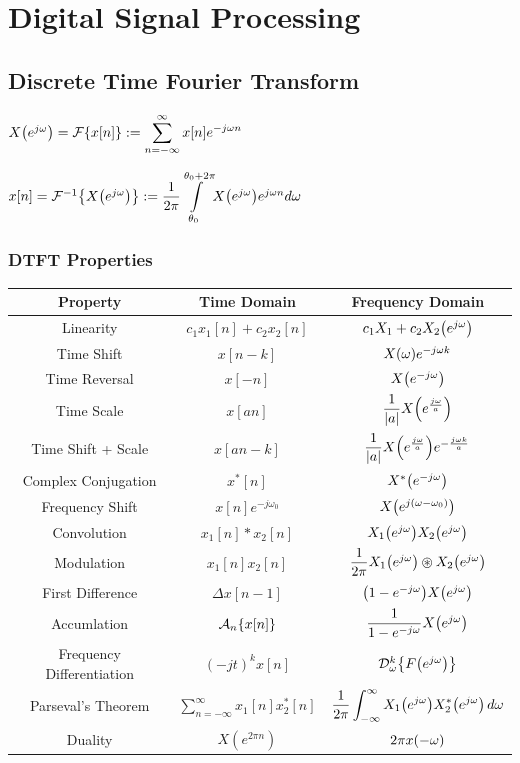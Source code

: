\documentclass[11pt]{article}
\begin{document}
  \section{Digital Signal Processing}

  \subsection{Discrete Time Fourier Transform}
  \begin{multicols}{2}
    \(X{\left( e^{j\omega} \right)} = \mathcal{F}{\left\{ x[n] \right\}} := \displaystyle \sum_{n = -\infty}^{\infty} x[n]e^{-j\omega n}\)

    \columnbreak

    \(x[n] = \mathcal{F}^{-1}{\left\{ X{\left( e^{j\omega} \right)} \right\}} :=
    \dfrac{1}{2\pi}\displaystyle{\int\limits_{\theta_0}^{\theta_0 + 2\pi}} \textstyle
    X{\left( e^{j\omega} \right)}e^{j\omega n} d\omega\)
  \end{multicols}

  \subsubsection{DTFT Properties}

  \bgroup
  \renewcommand{\arraystretch}{2.1}
  \setlength{\tabcolsep}{0.8cm}
  \large\begin{tabular}{c|c|c}
    Property & Time Domain & Frequency Domain \\
    \toprule
    Linearity & \(c_1x_1[n] + c_2x_2[n]\) & \(c_1X_1 + c_2X_2{\left( e^{j\omega} \right)}\) \\
    Time Shift & \(x[n - k]\) & \(X{\left( \omega \right)}e^{-j\omega k}\)\\
    Time Reversal & \(x[-n]\) & \(X{\left( e^{-j\omega} \right)}\)\\
    Time Scale & \(x[an]\) & \(\dfrac{1}{|a|}X{\left( e^{\frac{j\omega}{a}} \right)}\)\\
    Time Shift + Scale & \(x[an - k]\) & \(\dfrac{1}{|a|}X{\left( e^{\frac{j\omega}{a}} \right)}e^{-\frac{j\omega k}{a}}\)\\
    Complex Conjugation & \(x^*[n]\) & \(X^*{\left( e^{-j\omega} \right)}\)\\
    Frequency Shift & \(x[n]e^{-j\omega_0}\) & \(X{\left( e^{j(\omega - \omega_0)} \right)}\)\\
    Convolution & \(x_1[n] * x_2[n]\) & \(X_1{\left( e^{j\omega} \right)}X_2{\left( e^{j\omega} \right)}\) \\
    Modulation & \(x_1[n]x_2[n]\) & \(\dfrac{1}{2\pi} X_1\prn{e^{j\omega}} \oast X_2\prn{e^{j\omega}}\) \\
    First Difference & \(\Delta x[n - 1]\) & \({\left( 1 - e^{-j\omega} \right)}X{\left( e^{j\omega} \right)}\) \\
    Accumlation & \(\mathcal{A}_n\{x[n]\}\) & \(\dfrac{1}{1 - e^{-j\omega}}X{\left( e^{j\omega} \right)}\) \\
    Frequency Differentiation & \((-jt)^k x[n]\) & \(\mathcal{D}_{\omega}^k{\left\{ F{\left( e^{j\omega} \right)} \right\}}\) \\
    Parseval's Theorem & \(\displaystyle\sum_{n = -\infty}^{\infty} x_1[n]x_2^*[n] \) &
    \(\dfrac{1}{2\pi}\displaystyle\int_{-\infty}^{\infty} X_1{\left( e^{j\omega} \right)}X_2^*{\left( e^{j\omega} \right)} \,d\omega\) \\
    Duality & \(X(e^{2\pi n})\) & \(2\pi x{\left( -\omega \right)}\)
  \end{tabular}
  \egroup
\end{document}
